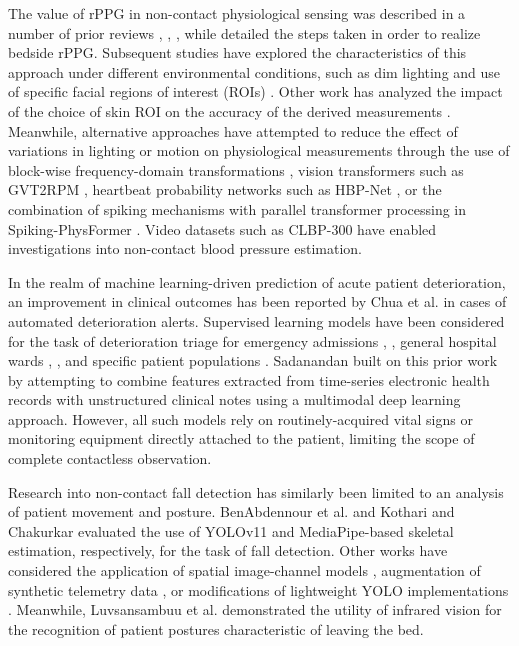 \documentclass[conference]{IEEEtran}
\begin{document}
The value of rPPG in non-contact physiological sensing was described in a number of prior reviews \cite{ref2}, \cite{ref11}, \cite{ref21}, while \cite{ref5} detailed the steps taken in order to realize bedside rPPG. Subsequent studies have explored the characteristics of this approach under different environmental conditions, such as dim lighting \cite{ref16} and use of specific facial regions of interest (ROIs) \cite{ref7}. Other work has analyzed the impact of the choice of skin ROI on the accuracy of the derived measurements \cite{ref18}. Meanwhile, alternative approaches have attempted to reduce the effect of variations in lighting or motion on physiological measurements through the use of block-wise frequency-domain transformations \cite{ref22}, vision transformers such as GVT2RPM \cite{ref12}, heartbeat probability networks such as HBP-Net \cite{ref15}, or the combination of spiking mechanisms with parallel transformer processing in Spiking-PhysFormer \cite{ref25}. Video datasets such as CLBP-300 \cite{ref17} have enabled investigations into non-contact blood pressure estimation.

In the realm of machine learning-driven prediction of acute patient deterioration, an improvement in clinical outcomes has been reported by Chua et al. \cite{ref3} in cases of automated deterioration alerts. Supervised learning models have been considered for the task of deterioration triage for emergency admissions \cite{ref4}, \cite{ref6}, general hospital wards \cite{ref9}, \cite{ref13}, and specific patient populations \cite{ref14}. Sadanandan \cite{ref10} built on this prior work by attempting to combine features extracted from time-series electronic health records with unstructured clinical notes using a multimodal deep learning approach. However, all such models rely on routinely-acquired vital signs or monitoring equipment directly attached to the patient, limiting the scope of complete contactless observation.

Research into non-contact fall detection has similarly been limited to an analysis of patient movement and posture. BenAbdennour et al. \cite{ref1} and Kothari and Chakurkar \cite{ref23} evaluated the use of YOLOv11 and MediaPipe-based skeletal estimation, respectively, for the task of fall detection. Other works have considered the application of spatial image-channel models \cite{ref19}, augmentation of synthetic telemetry data \cite{ref20}, or modifications of lightweight YOLO implementations \cite{ref24}. Meanwhile, Luvsansambuu et al. \cite{ref8} demonstrated the utility of infrared vision for the recognition of patient postures characteristic of leaving the bed.
\end{document}
